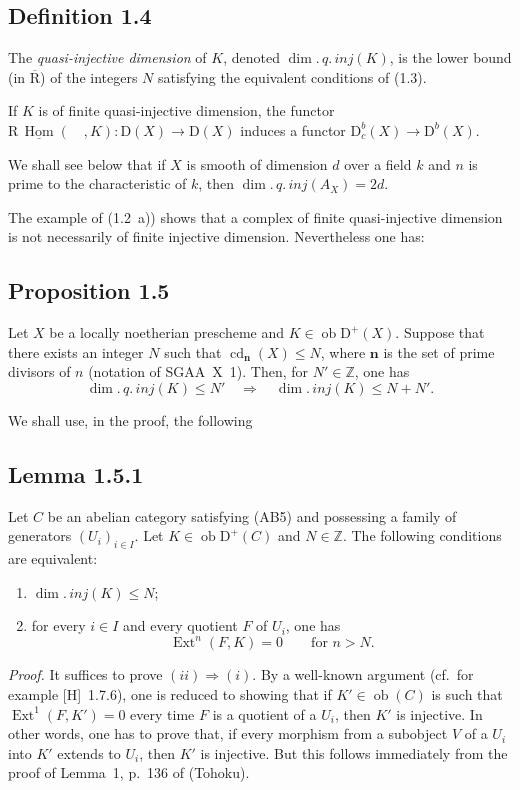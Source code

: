 \documentclass[11pt]{article}
\DeclareMathOperator{\Hom}{Hom}
\DeclareMathOperator{\Ext}{Ext}
\DeclareMathOperator{\cd}{cd}
\newcommand{\R}{\mathrm{R}}
\newcommand{\D}{\mathrm{D}}
\newcommand{\Z}{\mathbb{Z}}
\newcommand{\ob}{\operatorname{ob}}
\begin{document}
\subsection*{Definition 1.4}
The \emph{quasi-injective dimension} of $K$, denoted $\dim.\,q.\,inj(K)$, is the lower bound (in $\overline{\R}$) of the integers $N$ satisfying the equivalent conditions of (1.3).

If $K$ is of finite quasi-injective dimension, the functor $\R\,\underline{\Hom}(\quad,K) : \D(X) \to \D(X)$ induces a functor $\D_c^{b}(X) \to \D^{b}(X)$.

We shall see below that if $X$ is smooth of dimension $d$ over a field $k$ and $n$ is prime to the characteristic of $k$, then $\dim.\,q.\,inj(A_X) = 2d$.

The example of (1.2~a)) shows that a complex of finite quasi-injective dimension is not necessarily of finite injective dimension. Nevertheless one has:

\subsection*{Proposition 1.5}
Let $X$ be a locally noetherian prescheme and $K \in \ob \D^{+}(X)$. Suppose that there exists an integer $N$ such that $\cd_{\mathbf{n}}(X) \leqslant N$, where $\mathbf{n}$ is the set of prime divisors of $n$ (notation of SGAA~X~1). Then, for $N' \in \Z$, one has
\[
\dim.\,q.\,inj(K) \leqslant N' \quad \Longrightarrow \quad \dim.\,inj(K) \leqslant N + N'.
\]

We shall use, in the proof, the following

\subsection*{Lemma 1.5.1}
Let $C$ be an abelian category satisfying (AB5) and possessing a family of generators $(U_i)_{i \in I}$. Let $K \in \ob \D^{+}(C)$ and $N \in \Z$. The following conditions are equivalent:
\begin{enumerate}[label=(\roman*)]
\item $\dim.\,inj(K) \leqslant N$;
\item for every $i \in I$ and every quotient $F$ of $U_i$, one has
\[
\Ext^n(F,K) = 0 \qquad \text{for } n > N.
\]
\end{enumerate}

\emph{Proof.} It suffices to prove $(ii) \Rightarrow (i)$. By a well-known argument (cf.\ for example [H]~1.7.6), one is reduced to showing that if $K' \in \ob(C)$ is such that $\Ext^1(F,K') = 0$ every time $F$ is a quotient of a $U_i$, then $K'$ is injective. In other words, one has to prove that, if every morphism from a subobject $V$ of a $U_i$ into $K'$ extends to $U_i$, then $K'$ is injective. But this follows immediately from the proof of Lemma~1, p.~136 of (Tohoku).
\end{document}
